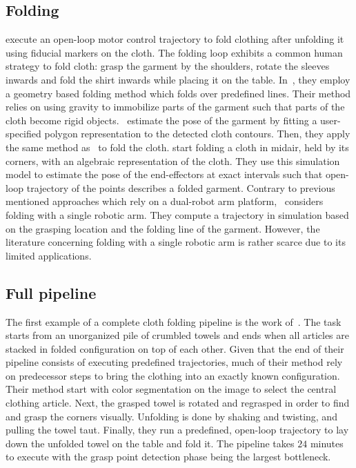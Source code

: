 \documentclass[\home/main.tex]{subfiles}
\begin{document}
\subsection{Folding}
\Textcite{Bersch2011} execute an open-loop motor control trajectory to fold clothing after unfolding it using fiducial markers on the cloth. The folding loop exhibits a common human strategy to fold cloth: grasp the garment by the shoulders, rotate the sleeves inwards and fold the shirt inwards while placing it on the table. In~\autocite{Berg2010}, they employ a geometry based folding method which folds over predefined lines. Their method relies on using gravity to immobilize parts of the garment such that parts of the cloth become rigid objects.~\autocite{Miller2012} estimate the pose of the garment by fitting a user-specified polygon representation to the detected cloth contours. Then, they apply the same method as~\autocite{Berg2010} to fold the cloth. \Autocite{Yamakawa2011} start folding a cloth in midair, held by its corners, with an algebraic representation of the cloth. They use this simulation model to estimate the pose of the end-effectors at exact intervals such that open-loop trajectory of the points describes a folded garment. Contrary to previous mentioned approaches which rely on a dual-robot arm platform,~\autocite{Petrik2017} considers folding with a single robotic arm. They compute a trajectory in simulation based on the grasping location and the folding line of the garment. However, the literature concerning folding with a single robotic arm is rather scarce due to its limited applications.

\subsection{Full pipeline}
The first example of a complete cloth folding pipeline is the work of~\textcite{Maitin2010}. The task starts from an unorganized pile of crumbled towels and ends when all articles are stacked in folded configuration on top of each other. Given that the end of their pipeline consists of executing predefined trajectories, much of their method rely on predecessor steps to bring the clothing into an exactly known configuration. Their method start with color segmentation on the image to select the central clothing article. Next, the grasped towel is rotated and regrasped in order to find and grasp the corners visually. Unfolding is done by shaking and twisting, and pulling the towel taut. Finally, they run a predefined, open-loop trajectory to lay down the unfolded towel on the table and fold it. The pipeline takes $24$ minutes to execute with the grasp point detection phase being the largest bottleneck.
\end{document}
